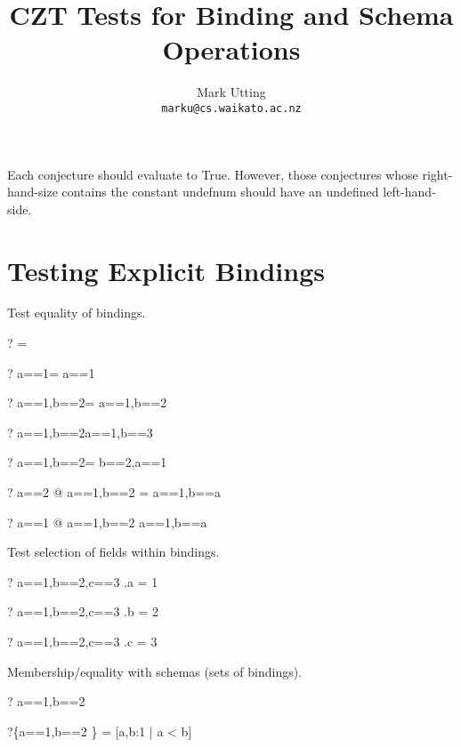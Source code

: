 \documentclass{article}
\title{CZT Tests for Binding and Schema Operations}
\author{Mark Utting \\ \texttt{marku@cs.waikato.ac.nz}}
\begin{document}
\maketitle

Each conjecture should evaluate to True.
However, those conjectures whose right-hand-size contains
the constant undefnum should have an undefined left-hand-side.


\section{Testing Explicit Bindings}

Test equality of bindings.
\begin{zed}\vdash? \lblot\rblot= \lblot\rblot\end{zed}
\begin{zed}\vdash? \lblot a==1\rblot= \lblot a==1\rblot\end{zed}
\begin{zed}\vdash? \lblot a==1,b==2\rblot= \lblot a==1,b==2\rblot\end{zed}
\begin{zed}\vdash? \lblot a==1,b==2\rblot\neq \lblot a==1,b==3\rblot\end{zed}
\begin{zed}\vdash? \lblot a==1,b==2\rblot= \lblot b==2,a==1\rblot\end{zed}
\begin{zed}\vdash? \forall a==2 @ \lblot a==1,b==2 \rblot = \lblot a==1,b==a\rblot\end{zed}
\begin{zed}\vdash? \forall a==1 @ \lblot a==1,b==2 \rblot \neq \lblot a==1,b==a\rblot\end{zed}

Test selection of fields within bindings.
\begin{zed}\vdash? \lblot a==1,b==2,c==3 \rblot.a = 1 \end{zed}
\begin{zed}\vdash? \lblot a==1,b==2,c==3 \rblot.b = 2 \end{zed}
\begin{zed}\vdash? \lblot a==1,b==2,c==3 \rblot.c = 3 \end{zed}

Membership/equality with schemas (sets of bindings).
\begin{zed}\vdash? \lblot a==1,b==2 \rblot \in [a,b:1 \upto 3 | a < b]\end{zed}
\begin{zed}\vdash?\{\lblot a==1,b==2 \rblot\} = [a,b:1  | a < b]\end{zed}
\end{document}
